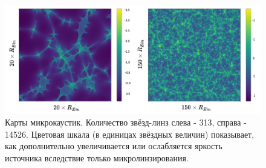 \begin{figure}[H]
    \centering
	\includegraphics[scale=0.22]{pics/maps_example.png}
	\caption{Карты микрокаустик. Количество звёзд-линз слева - 313, справа - 14526. Цветовая шкала (в единицах звёздных величин) показывает, как дополнительно увеличивается или ослабляется яркость источника вследствие только микролинзирования. \label{fig:micromaps}} 
\end{figure}